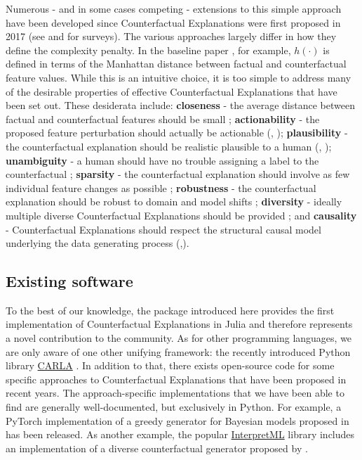 \documentclass{juliacon}
\begin{document}
Numerous - and in some cases competing - extensions to this simple
approach have been developed since Counterfactual Explanations were
first proposed in 2017 (see \cite{verma2020counterfactual} and
\cite{karimi2020survey} for surveys). The various approaches largely
differ in how they define the complexity penalty. In the baseline paper
\cite{wachter2017counterfactual}, for example, \(h(\cdot)\) is defined
in terms of the Manhattan distance between factual and counterfactual
feature values. While this is an intuitive choice, it is too simple to
address many of the desirable properties of effective Counterfactual
Explanations that have been set out. These desiderata include:
\textbf{closeness} - the average distance between factual and
counterfactual features should be small
\cite{wachter2017counterfactual}; \textbf{actionability} - the proposed
feature perturbation should actually be actionable
(\cite{ustun2019actionable}, \cite{poyiadzi2020face});
\textbf{plausibility} - the counterfactual explanation should be
realistic plausible to a human (\cite{joshi2019realistic},
\cite{schut2021generating}); \textbf{unambiguity} - a human should have
no trouble assigning a label to the counterfactual
\cite{schut2021generating}; \textbf{sparsity} - the counterfactual
explanation should involve as few individual feature changes as possible
\cite{schut2021generating}; \textbf{robustness} - the counterfactual
explanation should be robust to domain and model shifts
\cite{upadhyay2021robust}; \textbf{diversity} - ideally multiple diverse
Counterfactual Explanations should be provided
\cite{mothilal2020explaining}; and \textbf{causality} - Counterfactual
Explanations should respect the structural causal model underlying the
data generating process
(\cite{karimi2020algorithmic},\cite{karimi2021algorithmic}).

\hypertarget{existing-software}{%
\subsection{Existing software}\label{existing-software}}

To the best of our knowledge, the package introduced here provides the
first implementation of Counterfactual Explanations in Julia and
therefore represents a novel contribution to the community. As for other
programming languages, we are only aware of one other unifying
framework: the recently introduced Python library
\href{https://carla-counterfactual-and-recourse-library.readthedocs.io/en/latest/?badge=latest}{CARLA}
\cite{pawelczyk2021carla}. In addition to that, there exists open-source
code for some specific approaches to Counterfactual Explanations that
have been proposed in recent years. The approach-specific
implementations that we have been able to find are generally
well-documented, but exclusively in Python. For example, a PyTorch
implementation of a greedy generator for Bayesian models proposed in
\cite{schut2021generating} has been released. As another example, the
popular \href{https://github.com/interpretml}{InterpretML} library
includes an implementation of a diverse counterfactual generator
proposed by \cite{mothilal2020explaining}.
\end{document}

